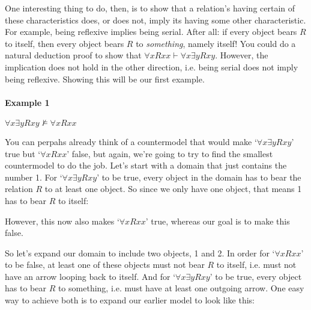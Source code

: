 One interesting thing to do, then, is to show that a relation's having certain of these characteristics does, or does not, imply  its having some other characteristic.  For example, being reflexive implies being serial. After all: if every object bears $R$ to itself, then every object bears $R$ to \emph{something}, namely itself!  You could do a natural deduction proof to show that $\forall x Rxx \vdash \forall x \exists y Rxy$.  However, the implication does not hold in the other direction, i.e. being serial does not imply being reflexive.  Showing this will be our first example.

\paragraph{Example 1} $\forall x \exists y Rxy \nvDash \forall xRxx$

You can perpahs already think of a countermodel that would make `$\forall x \exists y Rxy$' true but `$ \forall xRxx$' false, but again, we're going to try to find the smallest countermodel to do the job.  Let's start with a domain that just contains the number 1.  For `$\forall x \exists y Rxy$' to be true, every object in the domain has to bear the relation $R$ to at least one object.  So since we only have one object, that means 1 has to bear $R$ to itself:
\begin{center}
\end{center}
However, this now also makes `$\forall xRxx$' true, whereas our goal is to make this false.

So let's expand our domain to include two objects, 1 and 2.  In order for `$\forall xRxx$' to be false, at least one of these objects must not bear $R$ to itself, i.e. must not have an arrow looping back to itself.  And for `$\forall x\exists yRxy$' to be true, every object has to bear $R$ to something, i.e. must have at least one outgoing arrow.  One easy way to achieve both is to expand our earlier model to look like this:

